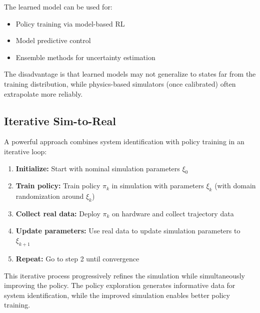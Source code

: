 The learned model can be used for:
\begin{itemize}
    \item Policy training via model-based RL
    \item Model predictive control
    \item Ensemble methods for uncertainty estimation
\end{itemize}

The disadvantage is that learned models may not generalize to states far from the training distribution, while physics-based simulators (once calibrated) often extrapolate more reliably.

\subsection{Iterative Sim-to-Real}

A powerful approach combines system identification with policy training in an iterative loop:

\begin{enumerate}
    \item \textbf{Initialize:} Start with nominal simulation parameters $\xi_0$
    \item \textbf{Train policy:} Train policy $\pi_k$ in simulation with parameters $\xi_k$ (with domain randomization around $\xi_k$)
    \item \textbf{Collect real data:} Deploy $\pi_k$ on hardware and collect trajectory data
    \item \textbf{Update parameters:} Use real data to update simulation parameters to $\xi_{k+1}$
    \item \textbf{Repeat:} Go to step 2 until convergence
\end{enumerate}

This iterative process progressively refines the simulation while simultaneously improving the policy. The policy exploration generates informative data for system identification, while the improved simulation enables better policy training.


